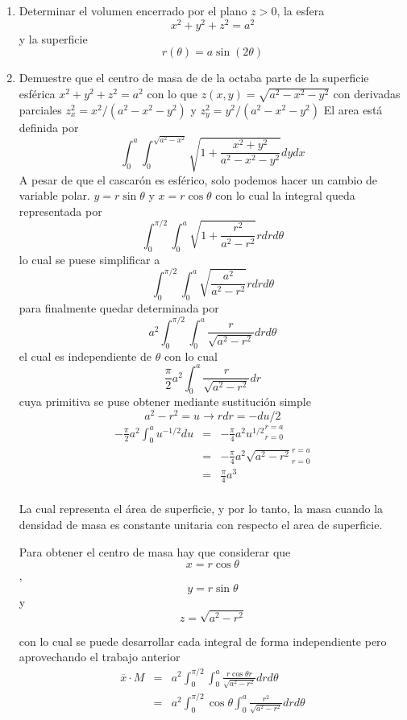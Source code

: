 \documentclass{article}
\begin{document}
	\begin{enumerate}
	
	\item Determinar el volumen encerrado por el plano $z>0$, la esfera $$x^2+y^2+z^2=a^2$$ y la superficie $$r(\theta) = a\sin(2\theta)$$

	\item Demuestre que el centro de masa de de la octaba parte de la superficie esférica $x^2+y^2+z^2 = a^2$	con lo que $z(x,y) = \sqrt{a^2-x^2-y^2}$	con derivadas parciales $z_x^2 = x^2/(a^2-x^2-y^2)$ y  $z_y^2 = y^2/(a^2-x^2-y^2)$
	El area está definida por 
	$$\int_0^a\int_0^{\sqrt{a^2-x^2}} \sqrt{1+\frac{x^2+y^2}{a^2-x^2-y^2}}dydx$$ A pesar de que el cascarón es esférico, solo podemos hacer un cambio de variable polar.
	$y = r \sin \theta$ y $x = r \cos \theta$ con lo cual la integral queda representada por 
		$$\int_0^{\pi/2}\int_0^{a} \sqrt{1+\frac{r^2}{a^2-r^2}}rdrd\theta$$ lo cual se puese simplificar a 
		$$\int_0^{\pi/2}\int_0^{a} \sqrt{\frac{a^2}{a^2-r^2}}rdrd\theta$$ para finalmente quedar determinada por 
				$$a^2\int_0^{\pi/2}\int_0^{a} \frac{r}{\sqrt{a^2-r^2}}drd\theta$$ el cual es independiente de $\theta$ con lo cual
				$$	\frac{\pi}{2}a^2\int_0^{a} \frac{r}{\sqrt{a^2-r^2}}dr$$ cuya primitiva se puse obtener mediante sustitución simple
				$$a^2-r^2 = u \to rdr =- du/2$$
\begin{eqnarray*}
	-\frac{\pi}{2}a^2\int_0^{a} u^{-1/2}du &=& -\frac{\pi}{4}a^2 {u^{1/2}}_{r=0}^{r=a}\\
	&=&  -\frac{\pi}{4}a^2 {\sqrt{a^2-r^2}}_{r=0}^{r=a}\\
	&=& \frac{\pi}{4}a^3 \\
\end{eqnarray*}

La cual representa el área de superficie, y por lo tanto, la masa cuando la densidad de masa es constante unitaria con respecto el area de superficie.

Para obtener el centro de masa hay que considerar que $$x=r\cos \theta$$, $$y = r\sin \theta$$ y $$z = \sqrt{a^2-r^2}$$

con lo cual se puede desarrollar cada integral de forma independiente pero aprovechando el trabajo anterior
\begin{eqnarray*}
\overline{x}\cdot M &=& a^2\int_0^{\pi/2}\int_0^{a} \frac{r\cos \theta r}{\sqrt{a^2-r^2}}drd\theta\\
&=& a^2\int_0^{\pi/2}\cos \theta \int_0^{a} \frac{r^2 }{\sqrt{a^2-r^2}}drd\theta\\
\end{eqnarray*}


\end{enumerate}
\end{document}
